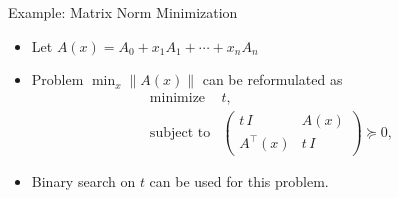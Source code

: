 \documentclass[10pt,ignorenonframetext,serif,onlymath]{beamer}
\providecommand{\tightlist}{%
  \setlength{\itemsep}{0pt}\setlength{\parskip}{0pt}}
\begin{document}
\begin{frame}{Example: Matrix Norm Minimization}
\protect\hypertarget{sec:example-matrix-norm-minimization}{}

\begin{itemize}
\tightlist
\item
  Let \(A(x) = A_0 + x_1 A_1 + \cdots + x_n A_n\)
\item
  Problem \(\min_x \| A(x) \|\) can be reformulated as
  \[\begin{array}{ll}
       \text{minimize}      & t, \\
       \text{subject to}    & \left(
   \begin{array}{cc}
    t\,I   & A(x) \\
    A^\top(x) & t\,I
   \end{array} \right) \succeq 0,
   \end{array}\]
\item
  Binary search on \(t\) can be used for this problem.
\end{itemize}

\end{frame}
\end{document}
